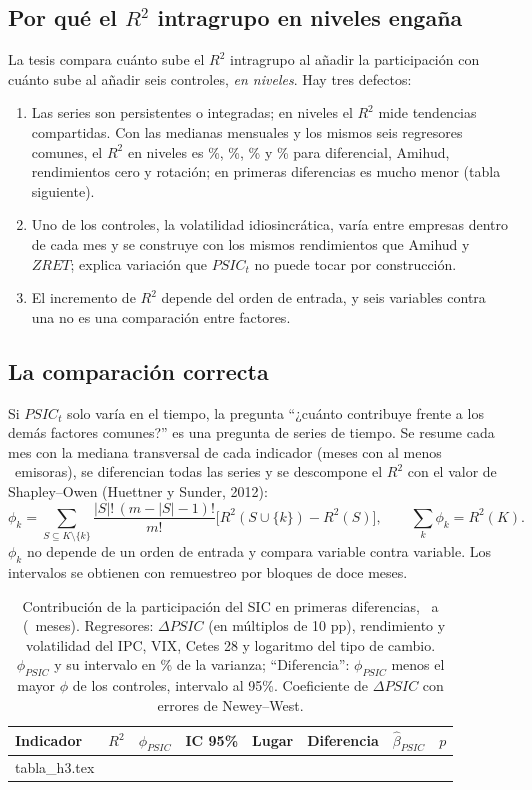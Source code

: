\documentclass[11pt,letterpaper]{article}
\makeatletter
\newcommand{\tablainput}[1]{\@@input #1.tex }
\theoremstyle{definition}
\theoremstyle{plain}
\newcommand{\PSIC}{\mathit{PSIC}}
\newcommand{\ZRET}{\mathit{ZRET}}
\makeatother
\begin{document}
\subsection{Por qué el $R^2$ intragrupo en niveles engaña}
La tesis compara cuánto sube el $R^2$ intragrupo al añadir la participación con cuánto sube al añadir seis controles, \emph{en niveles}. Hay tres defectos:
\begin{enumerate}[label=(\roman*)]
\item Las series son persistentes o integradas; en niveles el $R^2$ mide tendencias compartidas. Con las medianas mensuales y los mismos seis regresores comunes, el $R^2$ en niveles es \RlvRA\%, \RlvRB\%, \RlvRC\% y \RlvRD\% para diferencial, Amihud, rendimientos cero y rotación; en primeras diferencias es mucho menor (tabla siguiente).
\item Uno de los controles, la volatilidad idiosincrática, varía entre empresas dentro de cada mes y se construye con los mismos rendimientos que Amihud y $\ZRET$; explica variación que $\PSIC_t$ no puede tocar por construcción.
\item El incremento de $R^2$ depende del orden de entrada, y seis variables contra una no es una comparación entre factores.
\end{enumerate}

\subsection{La comparación correcta}
Si $\PSIC_t$ solo varía en el tiempo, la pregunta ``¿cuánto contribuye frente a los demás factores comunes?'' es una pregunta de series de tiempo. Se resume cada mes con la mediana transversal de cada indicador (meses con al menos \RnMin\ emisoras), se diferencian todas las series y se descompone el $R^2$ con el valor de Shapley--Owen (Huettner y Sunder, 2012):
\[
\phi_k=\sum_{S\subseteq K\setminus\{k\}}\frac{|S|!\,(m-|S|-1)!}{m!}\bigl[R^2(S\cup\{k\})-R^2(S)\bigr],\qquad \sum_k\phi_k=R^2(K).
\]
$\phi_k$ no depende de un orden de entrada y compara variable contra variable. Los intervalos se obtienen con remuestreo por bloques de doce meses.

\begin{table}[h]\centering\small
\caption{Contribución de la participación del SIC en primeras diferencias, \RmesIni\ a \RmesFin\ (\RnMeses\ meses). Regresores: $\Delta\PSIC$ (en múltiplos de 10 pp), rendimiento y volatilidad del IPC, VIX, Cetes 28 y logaritmo del tipo de cambio. $\phi_{\PSIC}$ y su intervalo en \% de la varianza; ``Diferencia'': $\phi_{\PSIC}$ menos el mayor $\phi$ de los controles, intervalo al 95\%. Coeficiente de $\Delta\PSIC$ con errores de Newey--West.}
\begin{tabular}{@{}lrrcccrr@{}}\toprule
Indicador & $R^2$ & $\phi_{\PSIC}$ & IC 95\% & Lugar & Diferencia & $\hat\beta_{\PSIC}$ & $p$\\\midrule
\tablainput{tabla_h3}
\bottomrule\end{tabular}
\end{table}
\end{document}
